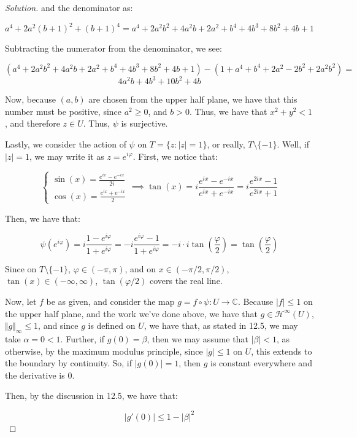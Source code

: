 \documentclass[10pt]{article}
\begin{document}
\begin{proof}[Solution]
and the denominator as:

$$ a^4 + 2a^2(b+1)^2 + (b+1)^4 = a^4 + 2a^2b^2 + 4a^2b + 2a^2 + b^4 + 4b^3 + 8b^2 + 4b + 1 $$

Subtracting the numerator from the denominator, we see:

$$ (a^4 + 2a^2b^2 + 4a^2b + 2a^2 + b^4 + 4b^3 + 8b^2 + 4b + 1) -  (1 + a^4 + b^4 + 2a^2 - 2b^2 + 2a^2b^2) = $$
$$ 4a^2b+ 4b^3+ 10 b^2 + 4b $$

Now, because $(a,b)$ are chosen from the upper half plane, we have that this number must be positive, since $a^2 \geq 0$, and $b > 0$. Thus, we have that $x^2 + y^2 < 1$, and therefore $z \in U$. Thus, $\psi$ is surjective.

Lastly, we consider the action of $\psi$ on $T = \{ z : |z| = 1 \}$, or really, $T \setminus \{ -1 \}$. Well, if $|z| = 1$, we may write it as $z = e^{i \varphi}$. First, we notice that:

$$\begin{cases} \sin(x) = \frac{e^{ix} - e^{-ix}}{2i} \\ \cos(x) = \frac{e^{ix} + e^{-ix}}{2} \end{cases} \implies \tan(x) = i \frac{e^{ix} - e^{-ix}}{e^{ix} + e^{-ix}} = i \frac{e^{2ix} - 1}{e^{2ix} + 1}$$

Then, we have that:

$$ \psi(e^{i\varphi}) = i \frac{1 - e^{i\varphi}}{1 + e^{i\varphi}} = -i \frac{ e^{i\varphi} - 1}{1 + e^{i\varphi}} = -i \cdot i \tan\left(\frac{\varphi}{2}\right) =  \tan\left(\frac{\varphi}{2}\right)$$

Since on $T \setminus \{ -1 \}$, $\varphi \in (-\pi, \pi)$, and on $x \in (-\pi/2, \pi/2)$, $\tan(x) \in (-\infty, \infty)$, $\tan(\varphi/2)$ covers the real line.

Now, let $f$ be as given, and consider the map $g = f \circ \psi: U \to \mathbb{C}$. Because $|f| \leq 1$ on the upper half plane, and the work we've done above, we have that $g \in \mathcal{H}^\infty(U)$, $\Vert g \Vert_\infty \leq 1$, and since $g$ is defined on $U$, we have that, as stated in 12.5, we may take $\alpha = 0 < 1$. Further, if $g(0) = \beta$, then we may assume that $| \beta | < 1$, as otherwise, by the maximum modulus principle, since $|g| \leq 1$ on $U$, this extends to the boundary by continuity. So, if $|g(0)| = 1$, then $g$ is constant everywhere and the derivative is 0.

Then, by the discussion in 12.5, we have that:

$$ |g'(0)| \leq 1 - | \beta |^2 $$


\end{proof}
\end{document}
